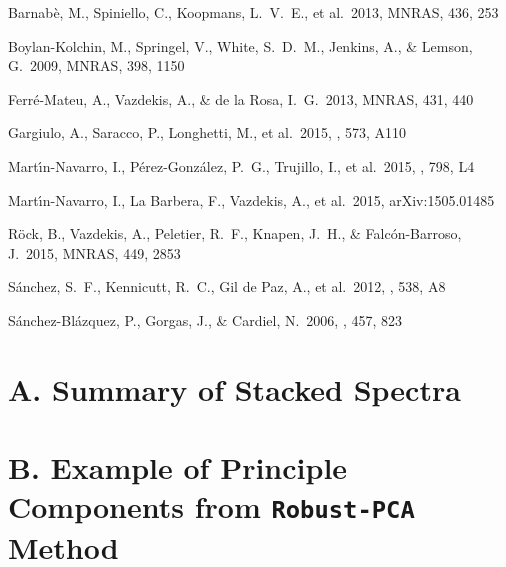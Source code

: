 \documentclass[preprint]{aastex}
\def\mnras{{MNRAS}}
\begin{document}
\begin{CJK*}{UTF8}{gbsn}

\begin{thebibliography}{}

     Barnab{\`e}, M., 
    Spiniello, C., Koopmans, L.~V.~E., et al.\ 2013, \mnras, 436, 253 

     Boylan-Kolchin, 
    M., Springel, V., White, S.~D.~M., Jenkins, A., 
    \& Lemson, G.\ 2009, \mnras, 398, 1150 
  
    Ferr{\'e}-Mateu, A., Vazdekis, A., \& de la Rosa, I.~G.\ 2013, \mnras, 431, 440 
  
     Gargiulo, A., 
    Saracco, P., Longhetti, M., et al.\ 2015, \aap, 573, A110 
  
    Mart{\'{\i}}n-Navarro, I., P{\'e}rez-Gonz{\'a}lez, P.~G., Trujillo, I., et 
    al.\ 2015, \apjl, 798, L4 
    
    Mart{\'{\i}}n-Navarro, I., La Barbera, F., Vazdekis, A., et al.\ 2015, 
    arXiv:1505.01485 
  
     R{\"o}ck, B., 
    Vazdekis, A., Peletier, R.~F., Knapen, J.~H., 
    \& Falc{\'o}n-Barroso, J.\ 2015, \mnras, 449, 2853 

    S{\'a}nchez, S.~F., Kennicutt, R.~C., Gil de Paz, A., et al.\ 2012, \aap, 538, A8 

    S{\'a}nchez-Bl{\'a}zquez, P., Gorgas, J., \& Cardiel, N.\ 2006, \aap, 457, 
    823 

\end{thebibliography}{}


\appendix

\section{A. Summary of Stacked Spectra}

\section{B. Example of Principle Components from {\tt Robust-PCA} Method}


\end{CJK*}
\end{document}
